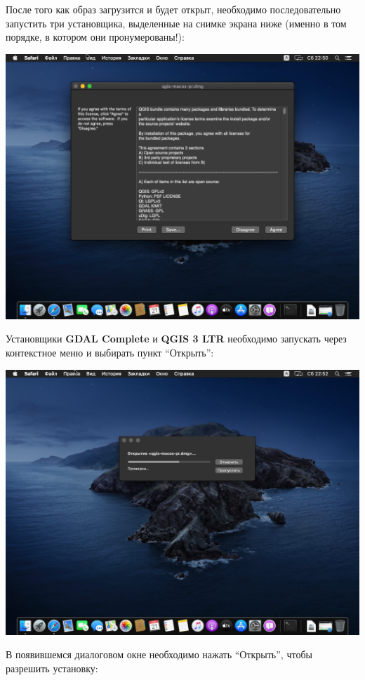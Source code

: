 \documentclass[
  12pt,
]{book}
\begin{document}
После того как образ загрузится и будет открыт, необходимо последовательно запустить три установщика, выделенные на снимке экрана ниже (именно в том порядке, в котором они пронумерованы!):

\includegraphics{images/installation_instruction_mac/mac02.png}

Установщики \textbf{GDAL Complete} и \textbf{QGIS 3 LTR} необходимо запускать через контекстное меню и выбирать пункт ``Открыть'':

\includegraphics{images/installation_instruction_mac/mac03.png}

В появившемся диалоговом окне необходимо нажать ``Открыть'', чтобы разрешить установку:
\end{document}
